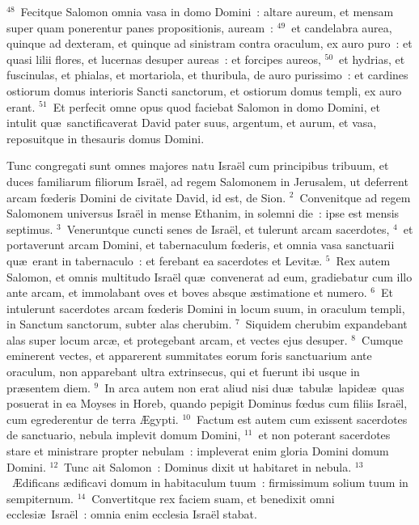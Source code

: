 ${}^{48}$~Fecitque Salomon omnia vasa in domo Domini~: altare aureum, et mensam super quam ponerentur panes propositionis, auream~:
${}^{49}$~et candelabra aurea, quinque ad dexteram, et quinque ad sinistram contra oraculum, ex auro puro~: et quasi lilii flores, et lucernas desuper aureas~: et forcipes aureos,
${}^{50}$~et hydrias, et fuscinulas, et phialas, et mortariola, et thuribula, de auro purissimo~: et cardines ostiorum domus interioris Sancti sanctorum, et ostiorum domus templi, ex auro erant.
${}^{51}$~Et perfecit omne opus quod faciebat Salomon in domo Domini, et intulit qu\ae\ sanctificaverat David pater suus, argentum, et aurum, et vasa, reposuitque in thesauris domus Domini.

\bchapter
\lettrine[lines=3,image=true,loversize=0.05,lraise=-0.03]{T}{}unc congregati sunt omnes majores natu Isra\"el cum principibus tribuum, et duces familiarum filiorum Isra\"el, ad regem Salomonem in Jerusalem, ut deferrent arcam fœderis Domini de civitate David, id est, de Sion.
${}^{2}$~Convenitque ad regem Salomonem universus Isra\"el in mense Ethanim, in solemni die~: ipse est mensis septimus.
${}^{3}$~Veneruntque cuncti senes de Isra\"el, et tulerunt arcam sacerdotes,
${}^{4}$~et portaverunt arcam Domini, et tabernaculum fœderis, et omnia vasa sanctuarii qu\ae\ erant in tabernaculo~: et ferebant ea sacerdotes et Levit\ae .
${}^{5}$~Rex autem Salomon, et omnis multitudo Isra\"el qu\ae\ convenerat ad eum, gradiebatur cum illo ante arcam, et immolabant oves et boves absque \ae stimatione et numero.
${}^{6}$~Et intulerunt sacerdotes arcam fœderis Domini in locum suum, in oraculum templi, in Sanctum sanctorum, subter alas cherubim.
${}^{7}$~Siquidem cherubim expandebant alas super locum arc\ae , et protegebant arcam, et vectes ejus desuper.
${}^{8}$~Cumque eminerent vectes, et apparerent summitates eorum foris sanctuarium ante oraculum, non apparebant ultra extrinsecus, qui et fuerunt ibi usque in pr\ae sentem diem.
${}^{9}$~In arca autem non erat aliud nisi du\ae\ tabul\ae\ lapide\ae\ quas posuerat in ea Moyses in Horeb, quando pepigit Dominus fœdus cum filiis Isra\"el, cum egrederentur de terra \AE gypti.
${}^{10}$~Factum est autem cum exissent sacerdotes de sanctuario, nebula implevit domum Domini,
${}^{11}$~et non poterant sacerdotes stare et ministrare propter nebulam~: impleverat enim gloria Domini domum Domini.
${}^{12}$~Tunc ait Salomon~: Dominus dixit ut habitaret in nebula.
${}^{13}$~\AE dificans \ae dificavi domum in habitaculum tuum~: firmissimum solium tuum in sempiternum.
${}^{14}$~Convertitque rex faciem suam, et benedixit omni ecclesi\ae\ Isra\"el~: omnia enim ecclesia Isra\"el stabat.
